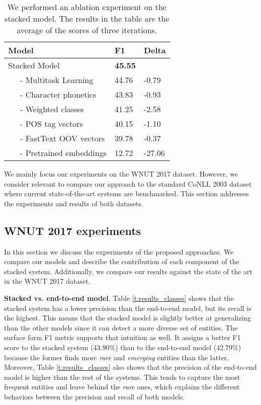 \documentclass[11pt,a4paper]{article}
\begin{document}
\begin{table}
\centering
\begin{tabular}{lll} \hline
Model & F1 & Delta\\\hline
Stacked Model & \textbf{45.55} & \\
~~~- Multitask Learning 	& 44.76  & -0.79\\
~~~- Character phonetics 	& 43.83  & -0.93\\
~~~- Weighted classes 		& 41.25	 & -2.58\\
~~~- POS tag vectors 		& 40.15  & -1.10\\
~~~- FastText OOV vectors 	& 39.78  & -0.37\\
~~~- Pretrained embeddings 	& 12.72  & -27.06\\
\hline
\end{tabular}
\caption{We performed an ablation experiment on the stacked model. The results in the table are the average of the scores of three iterations.}
\label{t:ablation}
\end{table}

We mainly focus our experiments on the WNUT 2017 dataset. However, we consider relevant to compare our approach to the standard CoNLL 2003 dataset where current state-of-the-art systems are benchmarked. This section addresses the experiments and results of both datasets.

\subsection{WNUT 2017 experiments}

In this section we discuss the experiments of the proposed approaches. We compare our models and describe the contribution of each component of the stacked system. Additionally, we compare our results against the state of the art in the WNUT 2017 dataset.

\noindent \textbf{Stacked vs. end-to-end model}. Table \ref{t:results_classes} shows that the stacked system has a lower precision than the end-to-end model, but its recall is the highest. This means that the stacked model is slightly better at generalizing than the other models since it can detect a more diverse set of entities. The surface form F1 metric \citep{DerczynskiEtAl:17} supports that intuition as well. It assigns a better F1 score to the stacked system (43.90\%) than to the end-to-end model (42.79\%) because the former finds more \textit{rare} and \textit{emerging} entities than the latter. Moreover, Table \ref{t:results_classes} also shows that the precision of the end-to-end model is higher than the rest of the systems. This tends to capture the most frequent entities and leave behind the \textit{rare} ones, which explains the different behaviors between the precision and recall of both models.
\end{document}
